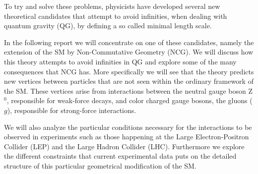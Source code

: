 To try and solve these problems, physicists have developed several new theoretical candidates that attempt to avoid infinities, when dealing with quantum gravity (QG), by defining a so called minimal length scale.

In the following report we will concentrate on one of these candidates, namely the extension of the SM by Non-Commutative Geometry (NCG). We will discuss how this theory attempts to avoid infinities in QG and explore some of the many consequences that NCG has. More specifically we will see that the theory predicts new vertices between particles that are not seen within the ordinary framework of the SM. These vertices arise from interactions between the neutral gauge boson Z$^0$, responsible for weak-force decays, and color charged gauge bosons, the gluons ($g$), responsible for strong-force interactions.

We will also analyze the particular conditions necessary for the interactions to be observed in experiments such as those happening at the Large Electron-Positron Collider (LEP) and the Large Hadron Collider (LHC). Furthermore we explore the different constraints that current experimental data puts on the detailed structure of this particular geometrical modification of the SM.
